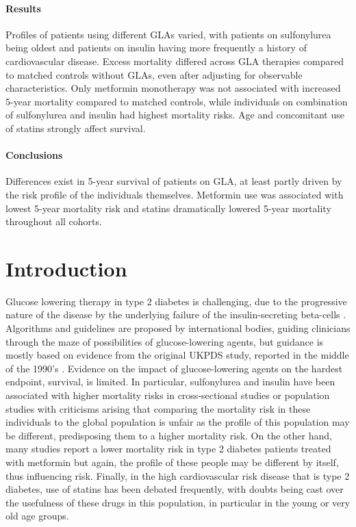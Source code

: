 {\paragraph{Results} Profiles of patients using different GLAs varied, with patients on sulfonylurea being oldest and patients on insulin having more frequently a history of cardiovascular disease. Excess mortality differed across GLA therapies compared to matched controls without GLAs, even after adjusting for observable characteristics. Only metformin monotherapy was not associated with increased 5-year mortality compared to matched controls, while individuals on combination of sulfonylurea and insulin had highest mortality risks. Age and concomitant use of statins strongly affect survival. 

\paragraph{Conclusions} Differences exist in 5-year survival of patients on GLA, at least partly driven by the risk profile of the individuals themselves. Metformin use was associated with lowest 5-year mortality risk and statins dramatically lowered 5-year mortality throughout all cohorts.
}



\cleardoublepage

\section{Introduction}
Glucose lowering therapy in type 2 diabetes is challenging, due to the progressive nature of the disease by the underlying failure of the insulin-secreting beta-cells \citep{s1}. Algorithms and guidelines are proposed by international bodies, guiding clinicians through the maze of possibilities of glucose-lowering agents, but guidance is mostly based on evidence from the original UKPDS study, reported in the middle of the 1990's \citep{s2}. Evidence on the impact of glucose-lowering agents on the hardest endpoint, survival, is limited. In particular, sulfonylurea and insulin have been associated with higher mortality risks in cross-sectional studies or population studies \citep{s3,s4,s5,s6,s7,s8} with criticisms arising that comparing the mortality risk in these individuals to the global population is unfair as the profile of this population may be different, predisposing them to a higher mortality risk. On the other hand, many studies report a lower mortality risk in type 2 diabetes patients treated with metformin \citep{s3,s4,s5,s6,s7,s8,s9} but again, the profile of these people may be different by itself, thus influencing risk. Finally, in the high cardiovascular risk disease that is type 2 diabetes, use of statins has been debated frequently, with doubts being cast over the usefulness of these drugs in this population, in particular in the young or very old age groups. 

